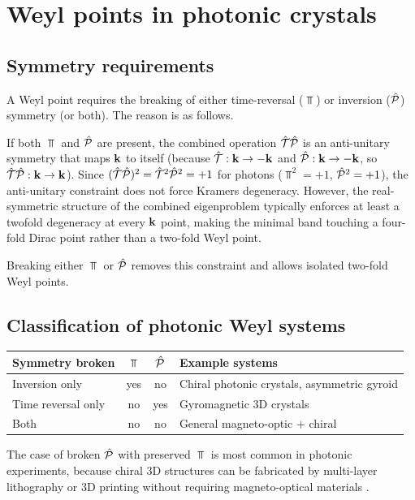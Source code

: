\section{Weyl points in photonic crystals}
\label{sec:ch15-photonic}

\subsection{Symmetry requirements}
\label{sec:ch15-symmetry}

A Weyl point requires the breaking of either time-reversal ($\Top$) or
inversion ($\hat{\mathcal{P}}$) symmetry (or both).  The reason is as follows.

If both $\Top$ and $\hat{\mathcal{P}}$ are present, the combined operation
$\hat{\mathcal{T}}\hat{\mathcal{P}}$ is an anti-unitary symmetry that maps $\mathbf{k}$ to itself
(because $\hat{\mathcal{T}}:\mathbf{k}\to-\mathbf{k}$ and $\hat{\mathcal{P}}:\mathbf{k}\to-\mathbf{k}$, so
$\hat{\mathcal{T}}\hat{\mathcal{P}}:\mathbf{k}\to\mathbf{k}$).  Since $(\hat{\mathcal{T}}\hat{\mathcal{P}})^2=\hat{\mathcal{T}}^2\hat{\mathcal{P}}^2=+1$ for
photons ($\Top^2=+1$, $\hat{\mathcal{P}}^2=+1$), the anti-unitary constraint does
not force Kramers degeneracy.  However, the real-symmetric structure of
the combined eigenproblem typically enforces at least a twofold
degeneracy at every $\mathbf{k}$ point, making the minimal band touching a
four-fold Dirac point rather than a two-fold Weyl point.

Breaking either $\Top$ or $\hat{\mathcal{P}}$ removes this constraint and allows
isolated two-fold Weyl points.

\subsection{Classification of photonic Weyl systems}
\label{sec:ch15-classification}

\begin{center}
\begin{tabular}{lccl}
  \toprule
  \textbf{Symmetry broken} & $\Top$ & $\hat{\mathcal{P}}$ &
    \textbf{Example systems} \\
  \midrule
  Inversion only & yes & no &
    Chiral photonic crystals, asymmetric gyroid \\
  Time reversal only & no & yes &
    Gyromagnetic 3D crystals \\
  Both & no & no &
    General magneto-optic + chiral \\
  \bottomrule
\end{tabular}
\end{center}

The case of broken $\hat{\mathcal{P}}$ with preserved $\Top$ is most common in
photonic experiments, because chiral 3D structures can be fabricated
by multi-layer lithography or 3D printing without requiring
magneto-optical materials \cite{lu2012weyl}.

